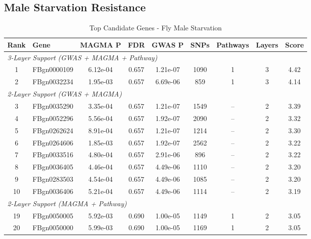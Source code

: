 \documentclass[11pt]{article}
\begin{document}
\vspace{1cm}


\subsection*{Male Starvation Resistance}

\begin{table}[h!]
\centering
\caption{Top Candidate Genes - Fly Male Starvation}
\small
\begin{tabular}{clccccccc}
\toprule
\textbf{Rank} & \textbf{Gene} & \textbf{MAGMA P} & \textbf{FDR} & \textbf{GWAS P} & \textbf{SNPs} & \textbf{Pathways} & \textbf{Layers} & \textbf{Score} \\
\midrule
\multicolumn{9}{l}{\textit{3-Layer Support (GWAS + MAGMA + Pathway)}} \\
1 & FBgn0000109 & 6.12e-04 & 0.657 & 1.21e-07 & 1090 & 1 & 3 & 4.42 \\
2 & FBgn0032234 & 1.95e-03 & 0.657 & 6.69e-06 & 859 & 1 & 3 & 4.14 \\
\midrule
\multicolumn{9}{l}{\textit{2-Layer Support (GWAS + MAGMA)}} \\
3 & FBgn0035290 & 3.35e-04 & 0.657 & 1.21e-07 & 1549 & -- & 2 & 3.39 \\
4 & FBgn0052296 & 5.56e-04 & 0.657 & 1.92e-07 & 2090 & -- & 2 & 3.32 \\
5 & FBgn0262624 & 8.91e-04 & 0.657 & 1.21e-07 & 1214 & -- & 2 & 3.30 \\
6 & FBgn0264606 & 1.85e-03 & 0.657 & 1.92e-07 & 2562 & -- & 2 & 3.22 \\
7 & FBgn0033516 & 4.80e-04 & 0.657 & 2.91e-06 & 896 & -- & 2 & 3.22 \\
8 & FBgn0036405 & 4.46e-04 & 0.657 & 4.49e-06 & 1110 & -- & 2 & 3.20 \\
9 & FBgn0283503 & 4.54e-04 & 0.657 & 4.49e-06 & 1085 & -- & 2 & 3.20 \\
10 & FBgn0036406 & 5.21e-04 & 0.657 & 4.49e-06 & 1114 & -- & 2 & 3.19 \\
\midrule
\multicolumn{9}{l}{\textit{2-Layer Support (MAGMA + Pathway)}} \\
19 & FBgn0050005 & 5.92e-03 & 0.690 & 1.00e-05 & 1149 & 1 & 2 & 3.05 \\
20 & FBgn0050000 & 5.99e-03 & 0.690 & 1.00e-05 & 1169 & 1 & 2 & 3.05 \\
\bottomrule
\end{tabular}
\label{tab:male_genes}
\end{table}
\end{document}
